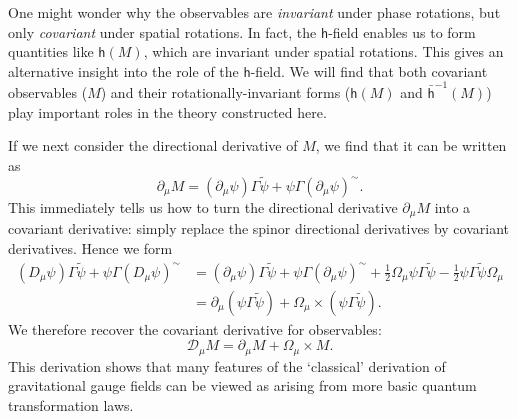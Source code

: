 \documentclass[a4paper]{article}
\numberwithin{equation}{section}
\newcommand{\nn}{\nonumber}
\newcommand{\crs}{\! \times \!}
\newcommand{\half}{{\textstyle \frac{1}{2}}}
\newcommand{\tld}{\sim}
\newcommand{\eqv}{=}
\newcommand{\cld}{{\mathcal{D}}}
\newcommand{\dmu}{\partial_{\mu}}
\newcommand{\psirev}{\tilde{\psi}}
\newcommand{\lih}{\mathsf{h}}
\newcommand{\lbh}{\bar{\mathsf{h}}}
\newcommand{\ho}{\lbh}
\newcommand{\hu}{\lih}
\begin{document}
One might wonder why the observables are {\em invariant\/} under phase
rotations, but only {\em covariant\/} under spatial rotations.  In
fact, the $\lih$-field enables us to form quantities like $\hu(M)$,
which are invariant under spatial rotations.  This gives an
alternative insight into the role of the $\lih$-field.  We will find
that both covariant observables ($M$) and their rotationally-invariant
forms ($\hu(M)$ and $\ho^{-1}(M)$) play important roles in the theory
constructed here.


If we next consider the directional derivative of $M$, we find that it
can be written as
%
\begin{equation}
\dmu M = (\dmu \psi) \Gamma \psirev + \psi \Gamma (\dmu \psi)^\tld.
\end{equation}
%
This immediately tells us how to turn the directional derivative
$\dmu M$ into a covariant derivative: simply replace the spinor
directional derivatives by covariant derivatives.  Hence we form
%
\begin{align}
(D_\mu \psi) \Gamma \psirev + \psi \Gamma (D_\mu \psi)^\tld 
&= (\dmu \psi) \Gamma \psirev + \psi \Gamma (\dmu \psi)^\tld + \half
\Omega_\mu  \psi \Gamma \psirev -\half \psi \Gamma \psirev
\Omega_\mu \nn  \\
&= \dmu (\psi \Gamma \psirev) + \Omega_\mu \crs (\psi \Gamma
\psirev).
\end{align}
%
We therefore recover the covariant derivative for observables:
%
\begin{equation}
\cld_\mu M \eqv \dmu M + \Omega_\mu \crs M .
\label{G-d25}
\end{equation}
%
This derivation shows that many features of the `classical' derivation
of gravitational gauge fields can be viewed as arising from more basic
quantum transformation laws.
\end{document}
